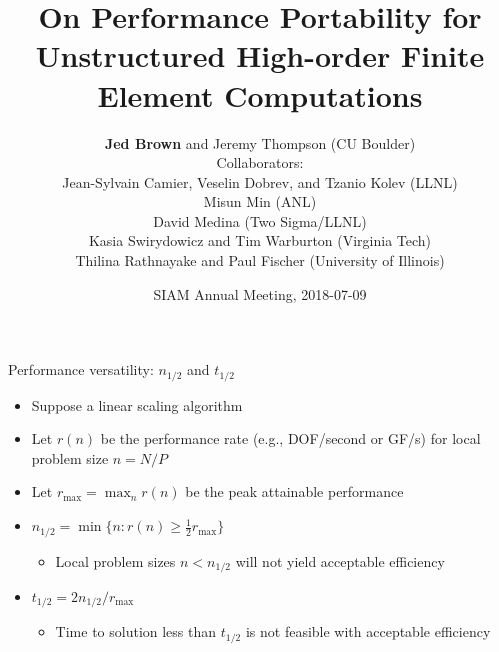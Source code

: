 \documentclass[aspectratio=169]{beamer}
\title{On Performance Portability for Unstructured High-order Finite Element Computations}
\author{{\bf Jed Brown} and Jeremy Thompson (CU Boulder) \\
  Collaborators: \\
  \quad Jean-Sylvain Camier, Veselin Dobrev, and Tzanio Kolev (LLNL) \\
  \quad Misun Min (ANL) \\
  \quad David Medina (Two Sigma/LLNL) \\
  \quad Kasia Swirydowicz and Tim Warburton (Virginia Tech) \\
  \quad Thilina Rathnayake and Paul Fischer (University of Illinois)}
\date{SIAM Annual Meeting, 2018-07-09}
\begin{document}
\lstset{language=C}
\normalem

\begin{frame}
  \titlepage
\end{frame}

\begin{frame}{Performance versatility: $n_{1/2}$ and $t_{1/2}$}
  \begin{itemize}
  \item Suppose a linear scaling algorithm
  \item Let $r(n)$ be the performance rate (e.g., DOF/second or GF/s) for local problem size $n = N/P$
  \item Let $r_{\max} = \max_n r(n)$ be the peak attainable performance
  \item $ n_{1/2} = \min \{ n : r(n) \ge \frac 1 2 r_{\max} \} $
    \begin{itemize}
    \item Local problem sizes $n < n_{1/2}$ will not yield acceptable efficiency
    \end{itemize}
  \item $ t_{1/2} = 2 n_{1/2} / r_{\max} $
    \begin{itemize}
    \item Time to solution less than $t_{1/2}$ is not feasible with acceptable efficiency
    \end{itemize}
  \end{itemize}
\end{frame}
\end{document}
